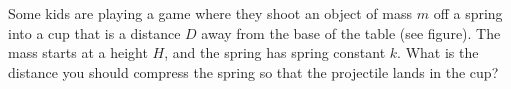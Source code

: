 Some kids are playing a game where they shoot an object of mass $m$
off a spring into a cup that is a distance $D$ away from the base of
the table (see figure). The mass starts at a height $H$, and the
spring has spring constant $k$. What is the distance you should
compress the spring so that the projectile lands in the cup?\answercheck
